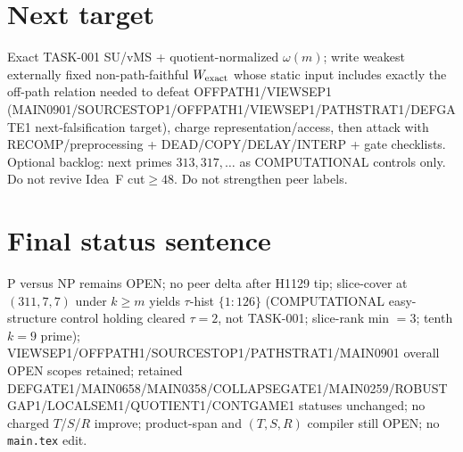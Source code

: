 \documentclass[11pt]{article}
\begin{document}
\section*{Next target}
Exact TASK-001 SU/vMS + quotient-normalized $\omega(m)$; write weakest externally fixed non-path-faithful
$W_{\rm exact}$ whose static input includes exactly the off-path relation needed to defeat OFFPATH1/VIEWSEP1
(MAIN0901/SOURCESTOP1/OFFPATH1/VIEWSEP1/PATHSTRAT1/DEFGATE1 next-falsification target), charge representation/access,
then attack with RECOMP/preprocessing + DEAD/COPY/DELAY/INTERP + gate checklists.
Optional backlog: next primes $313,317,\ldots$ as COMPUTATIONAL controls only.
Do not revive Idea~F cut$\ge48$. Do not strengthen peer labels.

\section*{Final status sentence}
P versus NP remains OPEN; no peer delta after H1129 tip; slice-cover at $(311,7,7)$ under $k{\ge}m$ yields $\tau$-hist $\{1{:}126\}$ (COMPUTATIONAL easy-structure control holding cleared $\tau{=}2$, not TASK-001; slice-rank min $=3$; tenth $k{=}9$ prime); VIEWSEP1/OFFPATH1/SOURCESTOP1/PATHSTRAT1/MAIN0901 overall OPEN scopes retained; retained DEFGATE1/MAIN0658/MAIN0358/COLLAPSEGATE1/MAIN0259/ROBUSTGAP1/LOCALSEM1/QUOTIENT1/CONTGAME1 statuses unchanged; no charged $T$/$S$/$R$ improve; product-span and $(T,S,R)$ compiler still OPEN; no \texttt{main.tex} edit.
\end{document}
